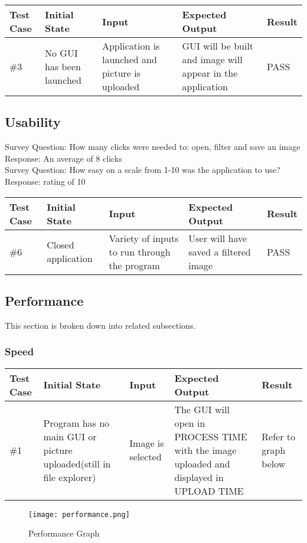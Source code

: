 \documentclass[12pt, titlepage]{article}
\begin{document}
\begin{table}[h]
\scriptsize
\begin{tabu} to 1.1\textwidth { | X[.3] | X[.7] | X[.7] | X[.7] | X[.3] |}
\hline
	      		Test Case & Initial State & Input & Expected Output & Result \\
\hline
\#3
& No GUI has been launched
& Application is launched and picture is uploaded
& GUI will be built and image will appear in the application
& PASS\\
\hline
	\end{tabu}
	\end{table}

\subsection{Usability}
\noindent Survey Question: How many clicks were needed to: open, filter and save an image\\
Response: An average of 8 clicks\\
Survey Question: How easy on a scale from 1-10 was the application to use?\\
Response: rating of 10\\

\begin{table}[h]
\scriptsize
\begin{tabu} to 1.1\textwidth { | X[.3] | X[.7] | X[.7] | X[.7] | X[.3] |}
\hline
	      		Test Case & Initial State & Input & Expected Output & Result \\
\hline
\#6
& Closed application
& Variety of inputs to run through the program
& User will have saved a filtered image
& PASS\\
\hline
	\end{tabu}
	\end{table}

\subsection{Performance}
This section is broken down into related subsections.
\subsubsection{Speed}
\begin{table}[h]
\scriptsize
\begin{tabu} to 1.1\textwidth { | X[.3] | X[.7] | X[.7] | X[.7] | X[.3] |}
\hline
	      		Test Case & Initial State & Input & Expected Output & Result \\
\hline
\#1
& Program has no main GUI or picture uploaded(still in file explorer)
& Image is selected
& The GUI will open in PROCESS TIME with the image uploaded and displayed in UPLOAD TIME
& Refer to graph below\\
\hline
	\end{tabu}
	\end{table}
\begin{figure}[h]
\texttt{[image: performance.png]}
\caption{Performance Graph}
\end{figure}
\end{document}
